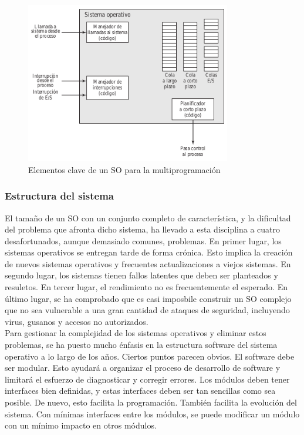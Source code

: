 \documentclass{article}
\begin{document}
				\begin{figure}
				\caption{Elementos clave de un SO para la multiprogramación}
				\label{figura20:elementos clave}
				\centering
				\includegraphics[width=0.8\textwidth, scale=1]{figura20.png}
				\end{figure}
				
			
			\subsubsection{Estructura del sistema}
				El tamaño de un SO con un conjunto completo de característica, y la dificultad del problema que afronta dicho sistema, ha llevado a esta disciplina a cuatro desafortunados, aunque demasiado comunes, problemas. En primer lugar, los sistemas operativos se entregan tarde de forma crónica. Esto implica la creación de nuevos sistemas operativos y frecuentes actualizaciones a viejos sistemas. En segundo lugar, los sistemas tienen fallos latentes que deben ser planteados y resuletos. En tercer lugar, el rendimiento no es frecuentemente el esperado. En último lugar, se ha comprobado que es casi imposbile construir un SO complejo que no sea vulnerable a una gran cantidad de ataques de seguridad, incluyendo virus, gusanos y accesos no autorizados. \\
				
				Para gestionar la complejidad de los sistemas operativos y eliminar estos problemas, se ha puesto mucho énfasis en la estructura software del sistema operativo a lo largo de los años. Ciertos puntos parecen obvios. El software debe ser modular. Esto ayudará a organizar el proceso de desarrollo de software y limitará el esfuerzo de diagnosticar y corregir errores. Los módulos deben tener interfaces bien definidas, y estas interfaces deben ser tan sencillas como sea posible. De nuevo, esto facilita la programación. También facilita la evolución del sistema. Con mínimas interfaces entre los módulos, se puede modificar un módulo con un mínimo impacto en otros módulos.	\\
				
\end{document}
